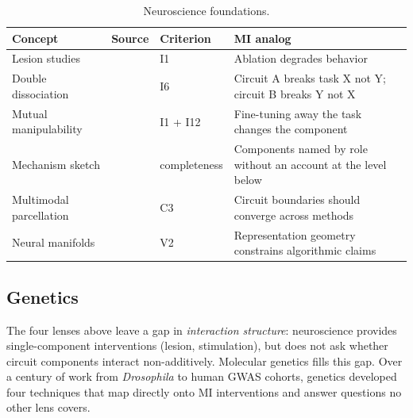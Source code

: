 \documentclass{article}
\begin{document}
\begin{table}[H]
\centering\small
\caption{Neuroscience foundations.}
\renewcommand{\arraystretch}{1.12}
\begin{tabular}{@{}l>{\raggedright\arraybackslash}p{2cm}l>{\raggedright\arraybackslash}p{4.5cm}@{}}
\toprule
\textbf{Concept} & \textbf{Source} & \textbf{Criterion} & \textbf{MI analog} \\
\midrule
Lesion studies & \citet{shallice1988neuropsychology} & I1 & Ablation degrades behavior \\
\midrule
Double dissociation & \citet{shallice1988neuropsychology} & I6 & Circuit A breaks task X not Y; circuit B breaks Y not X \\
\midrule
Mutual manipulability & \citet{craver2007explaining} & I1 + I12 & Fine-tuning away the task changes the component \\
\midrule
Mechanism sketch & \citet{craver2007explaining} & completeness & Components named by role without an account at the level below \\
\midrule
Multimodal parcellation & \citet{glasser2016multi} & C3 & Circuit boundaries should converge across methods \\
\midrule
Neural manifolds & \citet{gallego2017neural} & V2 & Representation geometry constrains algorithmic claims \\
\bottomrule
\end{tabular}
\end{table}


\subsection{Genetics}
\label{sec:genetics}

The four lenses above leave a gap in \emph{interaction structure}: neuroscience provides single-component interventions (lesion, stimulation), but does not ask whether circuit components interact non-additively. Molecular genetics fills this gap. Over a century of work from \emph{Drosophila} to human GWAS cohorts, genetics developed four techniques that map directly onto MI interventions and answer questions no other lens covers.
\end{document}
